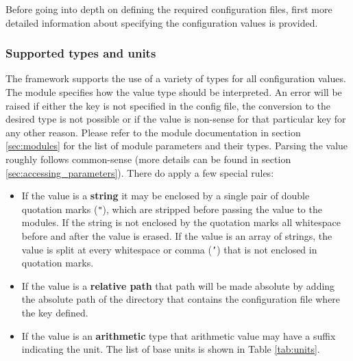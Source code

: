 Before going into depth on defining the required configuration files, first more detailed information about specifying the configuration values is provided.

\subsubsection{Supported types and units}
\label{sec:config_values}
The \apsq framework supports the use of a variety of types for all configuration values. The module specifies how the value type should be interpreted. An error will be raised if either the key is not specified in the config file, the conversion to the desired type is not possible or if the value is non-sense for that particular key for any other reason. Please refer to the module documentation in section \ref{sec:modules} for the list of module parameters and their types. Parsing the value roughly follows common-sense (more details can be found in section \ref{sec:accessing_parameters}). There do apply a few special rules:
\begin{itemize}
\item If the value is a \textbf{string} it may be enclosed by a single pair of double quotation marks (\texttt{"}), which are stripped before passing the value to the modules. If the string is not enclosed by the quotation marks all whitespace before and after the value is erased. If the value is an array of strings, the value is split at every whitespace or comma (\texttt{'}) that is not enclosed in quotation marks.
\item If the value is a \textbf{relative path} that path will be made absolute by adding the absolute path of the directory that contains the configuration file where the key defined.
\item If the value is an \textbf{arithmetic} type that arithmetic value may have a suffix indicating the unit. The list of base units is shown in Table \ref{tab:units}. 
\end{itemize}

